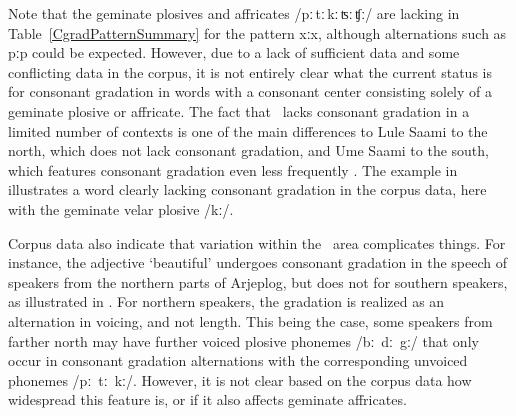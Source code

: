 Note that the geminate plosives and affricates \mbox{/pː\,tː\,kː\,ʦː\,ʧː/} are lacking in Table~\vref{CgradPatternSummary} for the pattern \mbox{xː\Div x}, although alternations such as \mbox{pː\Div p} could be expected. However, due to a lack of sufficient data and some conflicting data in the corpus, it is not entirely clear what the current status is for consonant gradation in words with a consonant center consisting solely of a geminate plosive or affricate. The fact that \PS\ lacks consonant gradation in a limited number of contexts is one of the main differences to Lule Saami to the north, which does not lack consonant gradation, and Ume Saami to the south, which features consonant gradation even less frequently \citep[cf.][21-23]{Sammallahti1998}. 
The example in  illustrates a word clearly lacking consonant gradation in the corpus data, here with the geminate velar plosive /kː/. 
\ea\label{CgradEx4a}%
\z

Corpus data also indicate that variation within the \PS\ area complicates things. For instance, the adjective  ‘beautiful’ undergoes consonant gradation in the speech of speakers from the northern parts of Arjeplog, but does not for southern speakers, as illustrated in . For northern speakers, the gradation is realized as an alternation in voicing, and not length. 
\ea\label{CgradEx4b}%
\z
This being the case, some speakers from farther north may have further voiced plosive phonemes \mbox{/bː dː gː/} that only occur in consonant gradation alternations with the corresponding unvoiced phonemes \mbox{/pː tː kː/}. However, it is not clear based on the corpus data how widespread this feature is, or if it also affects geminate affricates. 

